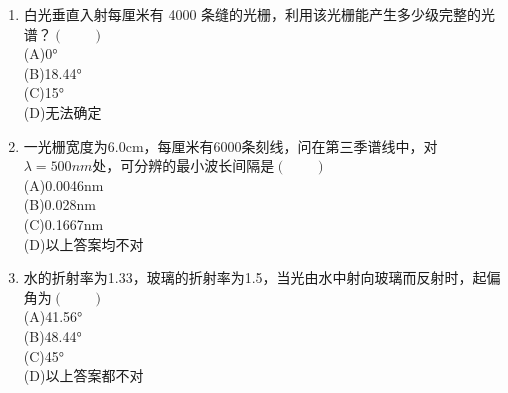 \begin{enumerate}
(C)0.4mm\\
(D)4mm
\item 白光垂直入射每厘米有 4000 条缝的光栅，利用该光栅能产生多少级完整的光谱？$(\qquad)$\\
(A)0°\\
(B)18.44°\\
(C)15°\\
(D)无法确定
\item 一光栅宽度为6.0cm，每厘米有6000条刻线，问在第三季谱线中，对$\lambda=500nm$处，可分辨的最小波长间隔是$(\qquad)$\\
(A)0.0046nm\\
(B)0.028nm\\
(C)0.1667nm\\
(D)以上答案均不对
\item 水的折射率为1.33，玻璃的折射率为1.5，当光由水中射向玻璃而反射时，起偏角为$(\qquad)$\\
(A)41.56°\\
(B)48.44°\\
(C)45°\\
(D)以上答案都不对
\end{enumerate}